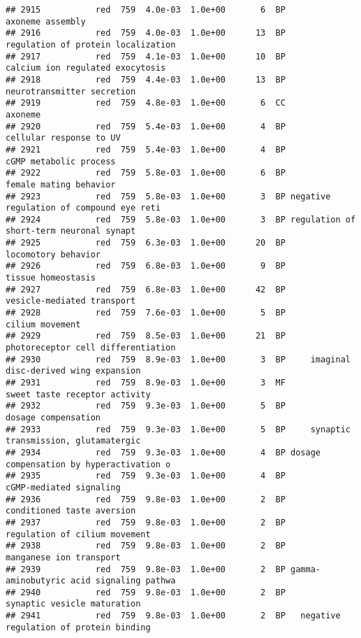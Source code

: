 \documentclass[]{article}
\begin{document}
\begin{verbatim}
## 2915           red  759  4.0e-03  1.0e+00       6  BP                         axoneme assembly
## 2916           red  759  4.0e-03  1.0e+00      13  BP       regulation of protein localization
## 2917           red  759  4.1e-03  1.0e+00      10  BP         calcium ion regulated exocytosis
## 2918           red  759  4.4e-03  1.0e+00      13  BP               neurotransmitter secretion
## 2919           red  759  4.8e-03  1.0e+00       6  CC                                  axoneme
## 2920           red  759  5.4e-03  1.0e+00       4  BP                  cellular response to UV
## 2921           red  759  5.4e-03  1.0e+00       4  BP                   cGMP metabolic process
## 2922           red  759  5.8e-03  1.0e+00       6  BP                   female mating behavior
## 2923           red  759  5.8e-03  1.0e+00       3  BP negative regulation of compound eye reti
## 2924           red  759  5.8e-03  1.0e+00       3  BP regulation of short-term neuronal synapt
## 2925           red  759  6.3e-03  1.0e+00      20  BP                      locomotory behavior
## 2926           red  759  6.8e-03  1.0e+00       9  BP                       tissue homeostasis
## 2927           red  759  6.8e-03  1.0e+00      42  BP               vesicle-mediated transport
## 2928           red  759  7.6e-03  1.0e+00       5  BP                          cilium movement
## 2929           red  759  8.5e-03  1.0e+00      21  BP       photoreceptor cell differentiation
## 2930           red  759  8.9e-03  1.0e+00       3  BP     imaginal disc-derived wing expansion
## 2931           red  759  8.9e-03  1.0e+00       3  MF            sweet taste receptor activity
## 2932           red  759  9.3e-03  1.0e+00       5  BP                      dosage compensation
## 2933           red  759  9.3e-03  1.0e+00       5  BP     synaptic transmission, glutamatergic
## 2934           red  759  9.3e-03  1.0e+00       4  BP dosage compensation by hyperactivation o
## 2935           red  759  9.3e-03  1.0e+00       4  BP                  cGMP-mediated signaling
## 2936           red  759  9.8e-03  1.0e+00       2  BP               conditioned taste aversion
## 2937           red  759  9.8e-03  1.0e+00       2  BP            regulation of cilium movement
## 2938           red  759  9.8e-03  1.0e+00       2  BP                  manganese ion transport
## 2939           red  759  9.8e-03  1.0e+00       2  BP gamma-aminobutyric acid signaling pathwa
## 2940           red  759  9.8e-03  1.0e+00       2  BP              synaptic vesicle maturation
## 2941           red  759  9.8e-03  1.0e+00       2  BP   negative regulation of protein binding

\end{verbatim}
\end{document}

